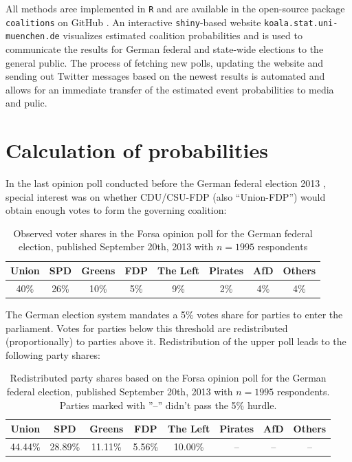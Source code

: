 \documentclass[smallcondensed]{svjour3}     %
\begin{document}
All methods aree implemented in \texttt{R} \citep{r_2017} and are available in the open-source
package \texttt{coalitions} on GitHub \citep{bender_bauer_2018}. An
interactive \texttt{shiny}-based \citep{chang_2017} website \texttt{koala.stat.uni-\allowbreak muenchen.\allowbreak de}
visualizes estimated coalition probabilities and is used to communicate the results
for German federal and state-wide elections to the general public.
The process of fetching new polls, updating the website and sending out Twitter messages based on the newest results is automated and allows for an immediate transfer of the estimated event probabilities to media and pulic.



\section{Calculation of probabilities} \label{sec:method}
In the last opinion poll conducted before the German federal election 2013 \citep{forsa_2013}, special interest was on whether CDU/CSU-FDP (also ``Union-FDP'') would obtain enough votes to form the governing coalition:

\begin{table}[!ht]\centering
\caption{Observed voter shares in the Forsa opinion poll for the German federal election, published September 20th, 2013 with $n=1995$ respondents
\label{tab_fdp}
}
\medskip
\begin{tabular}{cccccccc}
\toprule[0.09 em]
Union & SPD & Greens & FDP & The Left & Pirates & AfD & Others \\
\midrule
40\% & 26\% & 10\% & 5\% & 9\% & 2\% & 4\% & 4\% \\
\bottomrule[0.09 em]
\end{tabular}
\end{table}

The German election system mandates a 5\% votes share for parties to enter the parliament.
Votes for parties below this threshold are redistributed (proportionally) to parties
above it. Redistribution of the upper poll leads to the following party shares:

\begin{table}[!ht]\centering
\caption{Redistributed party shares based on the Forsa opinion poll for the German federal election, published September 20th, 2013 with $n=1995$ respondents. Parties marked with ''--'' didn't pass the 5\% hurdle.
\label{tab_fdp_redist}
}
\medskip
\begin{tabular}{cccccccc}
\toprule[0.09 em]
Union & SPD & Greens & FDP & The Left & Pirates & AfD & Others \\
\midrule
44.44\% & 28.89\% & 11.11\% & 5.56\% & 10.00\% & -- & -- & -- \\
\bottomrule[0.09 em]
\end{tabular}
\end{table}
\end{document}
